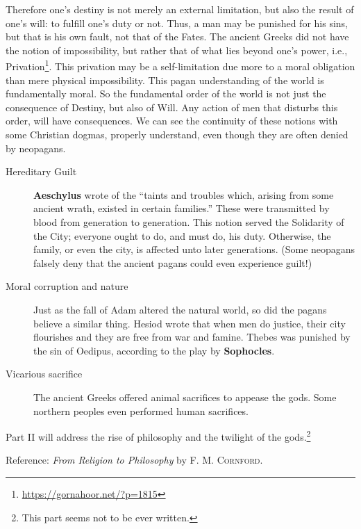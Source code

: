 Therefore one's destiny is not merely an external limitation, but also the result of one's will: to fulfill one's duty or not. Thus, a man may be punished for his sins, but that is his own fault, not that of the Fates. The ancient Greeks did not have the notion of impossibility, but rather that of what lies beyond one's power, i.e., Privation\footnote{\url{https://gornahoor.net/?p=1815}}. This privation may be a self-limitation due more to a moral obligation than mere physical impossibility. This pagan understanding of the world is fundamentally moral. So the fundamental order of the world is not just the consequence of Destiny, but also of Will. Any action of men that disturbs this order, will have consequences. We can see the continuity of these notions with some Christian dogmas, properly understand, even though they are often denied by neopagans.

\begin{description}

\item[Hereditary Guilt]

\textbf{Aeschylus} wrote of the ``taints and troubles which, arising from some ancient wrath, existed in certain families.'' These were transmitted by blood from generation to generation. This notion served the Solidarity of the City; everyone ought to do, and must do, his duty. Otherwise, the family, or even the city, is affected unto later generations. (Some neopagans falsely deny that the ancient pagans could even experience guilt!)
\item[Moral corruption and nature]

Just as the fall of Adam altered the natural world, so did the pagans believe a similar thing. Hesiod wrote that when men do justice, their city flourishes and they are free from war and famine. Thebes was punished by the sin of Oedipus, according to the play by \textbf{Sophocles}.

\item[Vicarious sacrifice]

The ancient Greeks offered animal sacrifices to appease the gods. Some northern peoples even performed human sacrifices.
\end{description}

Part II will address the rise of philosophy and the twilight of the gods.\footnote{This part seems not to be ever written.}

Reference: \emph{From Religion to Philosophy} by \textsc{F. M. Cornford}.



